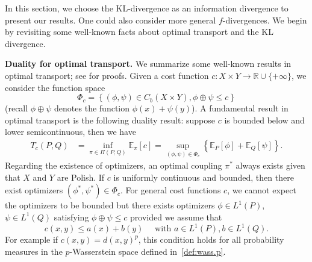 \documentclass{amsart}
\theoremstyle{definition}
\theoremstyle{remark}
\numberwithin{equation}{section}
\begin{document}
In this section, we choose the KL-divergence as an information divergence to present our results. One could also consider more general $f$-divergences.  We begin by revisiting some well-known facts about optimal transport and the KL divergence.

\textbf{Duality for optimal transport.}
We summarize some well-known results in optimal transport; see \cite{Villani2003topics, Villani2009oldandnew, Santambrogio} for proofs. Given a cost function $c: X \times Y \to \mathbb{R}\cup \{+\infty\}$, we consider the function space
\begin{equation}
\Phi_c = \left\{ (\phi, \psi) \in C_b(X\times Y), \phi \oplus \psi \le c \right\}
\end{equation}
(recall $\phi \oplus \psi$ denotes the function $\phi(x)+\psi(y)$). A fundamental result in optimal transport is the following duality result: suppose $c$ is bounded below and lower semicontinuous, then we have 
\begin{equation}\label{eq:transport:duality}
\begin{aligned}
T_{c}(P,Q) & =\inf_{\pi \in \Pi(P,Q)} \mathbb{E}_{\pi}[c] = \sup_{ (\phi, \psi) \in \Phi_c} \left\{  \mathbb{E}_P[\phi]+\mathbb{E}_{Q}[\psi]\right\}.
\end{aligned}
\end{equation}
Regarding the existence of optimizers,  an optimal coupling $\pi^*$ always exists given that $X$ and $Y$ are Polish.  If $c$ is uniformly continuous and bounded, 
then there exist optimizers $(\phi^*,\psi^*) \in \Phi_c$.  For general cost functions $c$, we cannot expect the optimizers to be bounded but there exists optimizers $\phi \in L^1(P)$, $\psi \in L^1(Q)$
satisfying $\phi\oplus \psi \le c$ provided we assume that 
\begin{equation}
c(x,y) \le a(x) + b(y) \quad \text{ with } a \in L^1(P), b \in L^1(Q). 
\end{equation}
For example if $c(x,y)=d(x,y)^p$,
this condition holds for all probability measures in the $p$-Wasserstein space defined in~\eqref{def:wass.p}.
\end{document}
